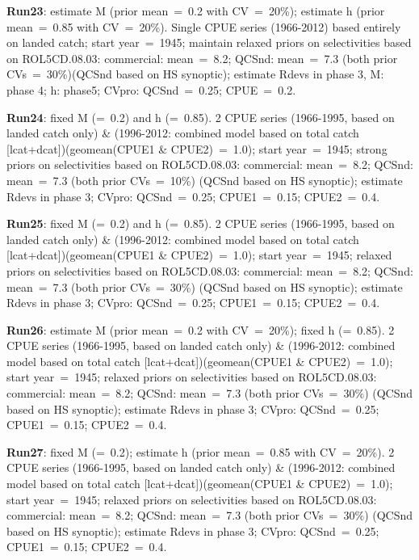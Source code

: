 {\bf Run23}: estimate M (prior mean~=~0.2 with CV~=~20\%); estimate h (prior mean~=~0.85 with CV~=~20\%).   Single CPUE series (1966-2012) based entirely on landed catch; start year~=~1945; maintain relaxed priors on selectivities based on ROL5CD.08.03: commercial: mean~=~8.2; QCSnd: mean~=~7.3 (both prior CVs~=~30\%)(QCSnd based on HS synoptic); estimate Rdevs in phase 3, M: phase 4; h: phase5; CVpro: QCSnd~=~0.25; CPUE~=~0.2. \newline

{\bf Run24}: fixed M (=~0.2) and h (=~0.85). 2 CPUE series (1966-1995, based on landed catch only) \& (1996-2012: combined model based on total catch [lcat+dcat])(geomean(CPUE1 \& CPUE2)~=~1.0); start year~=~1945; strong priors on selectivities based on ROL5CD.08.03: commercial: mean~=~8.2; QCSnd: mean~=~7.3 (both prior CVs~=~10\%) (QCSnd based on HS synoptic); estimate Rdevs in phase 3; CVpro: QCSnd~=~0.25; CPUE1~=~0.15; CPUE2~=~0.4. \newline

{\bf Run25}: fixed M (=~0.2) and h (=~0.85). 2 CPUE series (1966-1995, based on landed catch only) \& (1996-2012: combined model based on total catch [lcat+dcat])(geomean(CPUE1 \& CPUE2)~=~1.0); start year~=~1945; relaxed priors on selectivities based on ROL5CD.08.03: commercial: mean~=~8.2; QCSnd: mean~=~7.3 (both prior CVs~=~30\%) (QCSnd based on HS synoptic); estimate Rdevs in phase 3; CVpro: QCSnd~=~0.25; CPUE1~=~0.15; CPUE2~=~0.4. \newline

{\bf Run26}: estimate M (prior mean~=~0.2 with CV~=~20\%); fixed h (=~0.85). 2 CPUE series (1966-1995, based on landed catch only) \& (1996-2012: combined model based on total catch [lcat+dcat])(geomean(CPUE1 \& CPUE2)~=~1.0); start year~=~1945; relaxed priors on selectivities based on ROL5CD.08.03: commercial: mean~=~8.2; QCSnd: mean~=~7.3 (both prior CVs~=~30\%) (QCSnd based on HS synoptic); estimate Rdevs in phase 3; CVpro: QCSnd~=~0.25; CPUE1~=~0.15; CPUE2~=~0.4. \newline

{\bf Run27}: fixed M (=~0.2); estimate h (prior mean~=~0.85 with CV~=~20\%). 2 CPUE series (1966-1995, based on landed catch only) \& (1996-2012: combined model based on total catch [lcat+dcat])(geomean(CPUE1 \& CPUE2)~=~1.0); start year~=~1945; relaxed priors on selectivities based on ROL5CD.08.03: commercial: mean~=~8.2; QCSnd: mean~=~7.3 (both prior CVs~=~30\%) (QCSnd based on HS synoptic); estimate Rdevs in phase 3; CVpro: QCSnd~=~0.25; CPUE1~=~0.15; CPUE2~=~0.4. \newline

